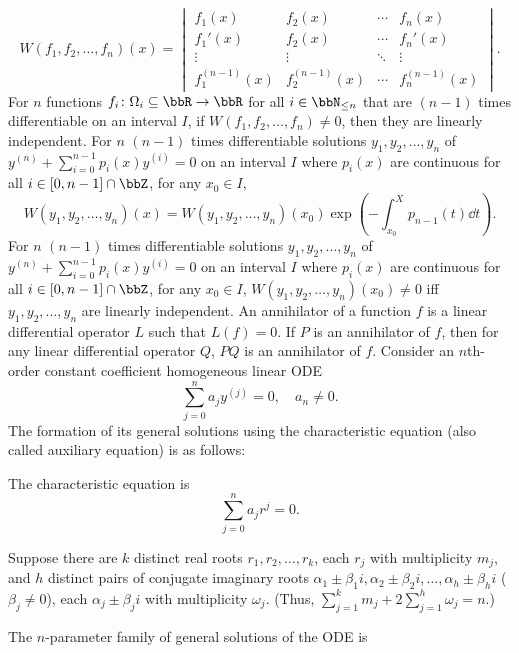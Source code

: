 \documentclass[a4paper,12pt]{article}
\begin{document}
\[W(f_1,f_2,\ldots,f_n)(x)=\begin{vmatrix}
f_1(x) & f_2(x) & \cdots & f_n(x) \\
f_1'(x) & f_2(x) & \cdots & f_n'(x) \\
\vdots & \vdots & \ddots & \vdots \\
f_1^{(n-1)}(x) & f_2^{(n-1)}(x) & \cdots & f_n^{(n-1)}(x)
\end{vmatrix}.\]
For $n$ functions $f_i\colon\Omega_i\subseteq\bbR\to\bbR$ for all $i\in\bbN_{\le n}$ that are $(n-1)$ times differentiable on an interval $I$, if $W(f_1,f_2,\ldots,f_n)\ne0$, then they are linearly independent.
For $n$ $(n-1)$ times differentiable solutions $y_1,y_2,\ldots,y_n$ of $y^{(n)}+\sum_{i=0}^{n-1}p_i(x)y^{(i)}=0$ on an interval $I$ where $p_i(x)$ are continuous for all $i\in[0,n-1]\cap\bbZ$, for any $x_0\in I$,
\[W(y_1,y_2,\ldots,y_n)(x)=W(y_1,y_2,\ldots,y_n)(x_0)\exp(-\int_{x_0}^Xp_{n-1}(t)\dd{t}).\]
For $n$ $(n-1)$ times differentiable solutions $y_1,y_2,\ldots,y_n$ of $y^{(n)}+\sum_{i=0}^{n-1}p_i(x)y^{(i)}=0$ on an interval $I$ where $p_i(x)$ are continuous for all $i\in[0,n-1]\cap\bbZ$, for any $x_0\in I$, $W(y_1,y_2,\ldots,y_n)(x_0)\ne 0$ iff $y_1,y_2,\ldots,y_n$ are linearly independent.
An annihilator of a function $f$ is a linear differential operator $L$ such that $L(f)=0$.
If $P$ is an annihilator of $f$, then for any linear differential operator $Q$, $PQ$ is an annihilator of $f$.
Consider an $n$th-order constant coefficient homogeneous linear ODE
\[\sum_{j=0}^na_jy^{(j)}=0,\quad a_n\neq 0.\]
The formation of its general solutions using the characteristic equation (also called auxiliary equation) is as follows:
\ben
\item The characteristic equation is
\[\sum_{j=0}^na_jr^j=0.\]
\item Suppose there are $k$ distinct real roots $r_1,r_2,\ldots,r_k$, each $r_j$ with multiplicity $m_j$, and $h$ distinct pairs of conjugate imaginary roots $\alpha_1\pm\beta_1i,\alpha_2\pm\beta_2i,\ldots,\alpha_h\pm\beta_hi$ ($\beta_j\neq 0$), each $\alpha_j\pm\beta_ji$ with multiplicity $\omega_j$. (Thus, $\sum_{j=1}^km_j+2\sum_{j=1}^h\omega_j=n$.)
\item The $n$-parameter family of general solutions of the ODE is
\end{document}
